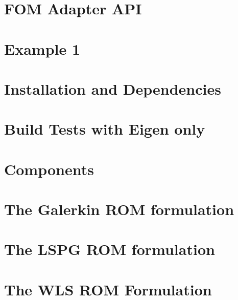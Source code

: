 \let\mypdfximage\pdfximage\def\pdfximage{\immediate\mypdfximage}\documentclass[twoside]{book}
\newcommand{\+}{\discretionary{\mbox{\scriptsize$\hookleftarrow$}}{}{}}
\begin{document}
\chapter{FOM Adapter API}
\label{md_pages_old_custom_ops}

\chapter{Example 1}
\label{md_pages_old_examples_example1}

\chapter{Installation and Dependencies}
\label{md_pages_old_getstarted_build_and_install}

\chapter{Build Tests with Eigen only}
\label{md_pages_old_getstarted_build_tests_eigen}

\chapter{Components}
\label{md_pages_old_getstarted_packages}

\chapter{The Galerkin ROM formulation}
\label{md_pages_old_various_formulation_galerkin}

\chapter{The LSPG ROM formulation}
\label{md_pages_old_various_formulation_lspg}

\chapter{The WLS ROM Formulation}
\label{md_pages_old_various_formulation_wls}

\end{document}
